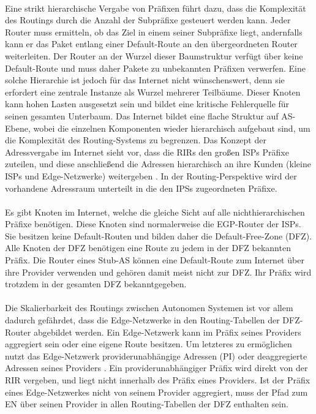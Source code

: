 \paragraph{}
Eine strikt hierarchische Vergabe von Präfixen führt dazu, dass die Komplexität des Routings durch die Anzahl der Subpräfixe gesteuert werden kann. Jeder Router muss ermitteln, ob das Ziel in einem seiner Subpräfixe liegt, andernfalls kann er das Paket entlang einer Default-Route an den übergeordneten Router weiterleiten. Der Router an der Wurzel dieser Baumstruktur verfügt über keine Default-Route und muss daher Pakete zu unbekannten Präfixen verwerfen. Eine solche Hierarchie ist jedoch für das Internet nicht wünschenswert, denn sie erfordert eine zentrale Instanze als Wurzel mehrerer Teilbäume. Dieser Knoten kann hohen Lasten ausgesetzt sein und bildet eine kritische Fehlerquelle für seinen gesamten Unterbaum. Das Internet bildet eine flache Struktur auf AS-Ebene, wobei die einzelnen Komponenten wieder hierarchisch aufgebaut sind, um die Komplexität des Routing-Systems zu begrenzen. Das Konzept der Adressvergabe im Internet sieht vor, dass die RIRs den großen ISPs Präfixe zuteilen, und diese anschließend die Adressen hierarchisch an ihre Kunden (kleine ISPs und Edge-Netzwerke) weitergeben \cite{ripe:ipv4}. In der Routing-Perspektive wird der vorhandene Adressraum unterteilt in die den IPSs zugeordneten Präfixe. 

\paragraph{}
Es gibt Knoten im Internet, welche die gleiche Sicht auf alle nichthierarchischen Präfixe benötigen. Diese Knoten sind normalerweise die EGP-Router der ISPs. Sie besitzen keine Default-Routen und bilden daher die Default-Free-Zone (DFZ). Alle Knoten der DFZ benötigen eine Route zu jedem in der DFZ bekannten Präfix. Die Router eines Stub-AS können eine Default-Route zum Internet über ihre Provider verwenden und gehören damit meist nicht zur DFZ. Ihr Präfix wird trotzdem in der gesamten DFZ bekanntgegeben. 

\paragraph{}
Die Skalierbarkeit des Routings zwischen Autonomen Systemen ist vor allem dadurch gefährdet, dass die Edge-Netzwerke in den Routing-Tabellen der DFZ-Router abgebildet werden.
Ein Edge-Netzwerk kann im Präfix seines Providers aggregiert sein oder eine eigene Route besitzen. Um letzteres zu ermöglichen nutzt das Edge-Netzwerk  providerunabhängige Adressen (PI) oder deaggregierte Adressen seines Providers \cite{jen:2008:start}. Ein providerunabhängiger Präfix wird direkt von der RIR vergeben, und liegt nicht innerhalb des Präfix eines Providers. Ist der Präfix eines Edge-Netzwerkes nicht von seinem Provider aggregiert, muss der Pfad zum EN über seinen Provider in allen Routing-Tabellen der DFZ enthalten sein.

